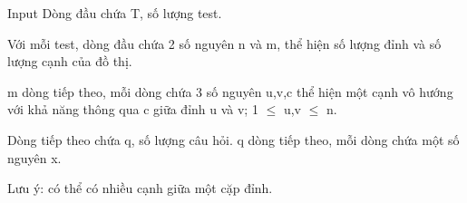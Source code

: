 Input  
Dòng đầu chứa T, số lượng test.  

   Với mỗi test, dòng đầu chứa 2 số nguyên n và m, thể hiện số lượng đỉnh và số lượng cạnh của đồ thị.  

   m dòng tiếp theo, mỗi dòng chứa 3 số nguyên u,v,c thể hiện một cạnh vô hướng với khả năng thông qua c giữa đỉnh u và v; 1  $\le$  u,v  $\le$  n.  

   Dòng tiếp theo chứa q, số lượng câu hỏi. q dòng tiếp theo, mỗi dòng chứa một số nguyên x.  

   Lưu ý: có thể có nhiều cạnh giữa một cặp đỉnh.